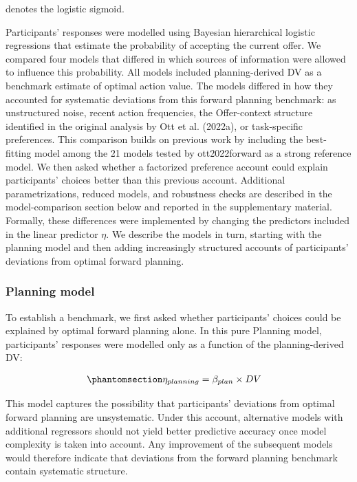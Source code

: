 \documentclass[
  letterpaper,
  DIV=11,
  numbers=noendperiod]{scrartcl}
\begin{document}
denotes the logistic sigmoid.

Participants' responses were modelled using Bayesian hierarchical
logistic regressions that estimate the probability of accepting the
current offer. We compared four models that differed in which sources of
information were allowed to influence this probability. All models
included planning-derived DV as a benchmark estimate of optimal action
value. The models differed in how they accounted for systematic
deviations from this forward planning benchmark: as unstructured noise,
recent action frequencies, the Offer-context structure identified in the
original analysis by Ott et al. (2022a), or task-specific preferences.
This comparison builds on previous work by including the best-fitting
model among the 21 models tested by ott2022forward as a strong reference
model. We then asked whether a factorized preference account could
explain participants' choices better than this previous account.
Additional parametrizations, reduced models, and robustness checks are
described in the model-comparison section below and reported in the
supplementary material. Formally, these differences were implemented by
changing the predictors included in the linear predictor \(\eta\). We
describe the models in turn, starting with the planning model and then
adding increasingly structured accounts of participants' deviations from
optimal forward planning.

\subsubsection{Planning model}\label{planning-model}

To establish a benchmark, we first asked whether participants' choices
could be explained by optimal forward planning alone. In this pure
Planning model, participants' responses were modelled only as a function
of the planning-derived DV:

\begin{equation}\protect\phantomsection\label{eq-planning-model}{
\begin{aligned}
\eta_{planning} &= \beta_{plan} \times DV
\end{aligned}
}\end{equation}

This model captures the possibility that participants' deviations from
optimal forward planning are unsystematic. Under this account,
alternative models with additional regressors should not yield better
predictive accuracy once model complexity is taken into account. Any
improvement of the subsequent models would therefore indicate that
deviations from the forward planning benchmark contain systematic
structure.
\end{document}
